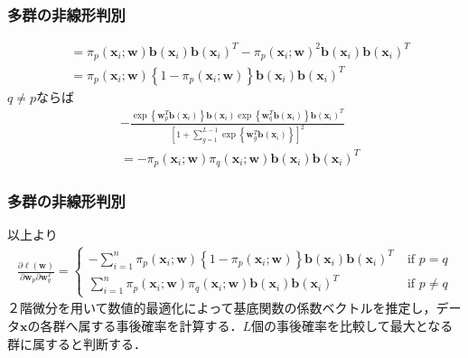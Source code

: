\documentclass[dvipdfmx,cjk]{beamer}
\theoremstyle{example}
\begin{document}
\begin{frame}
    \frametitle{多群の非線形判別}
    \begin{align*}
         & =\pi_p(\boldsymbol{x}_i;\boldsymbol{w})\boldsymbol{b}(\boldsymbol{x}_i)\boldsymbol{b}(\boldsymbol{x}_i)^T-\pi_p(\boldsymbol{x}_i;\boldsymbol{w})^2\boldsymbol{b}(\boldsymbol{x}_i)\boldsymbol{b}(\boldsymbol{x}_i)^T \\
         & =\pi_p(\boldsymbol{x}_i;\boldsymbol{w})\left\{1-\pi_p(\boldsymbol{x}_i;\boldsymbol{w})\right\}\boldsymbol{b}(\boldsymbol{x}_i)\boldsymbol{b}(\boldsymbol{x}_i)^T
    \end{align*}
    $q\neq p$ならば
    \begin{align*}
         & -\frac{\exp\left\{\boldsymbol{w}_p^T\boldsymbol{b}(\boldsymbol{x}_i)\right\}\boldsymbol{b}(\boldsymbol{x}_i)\exp\left\{\boldsymbol{w}_q^T\boldsymbol{b}(\boldsymbol{x}_i)\right\}\boldsymbol{b}(\boldsymbol{x}_i)^T}{\left[1+\sum\limits_{g=1}^{L-1}\exp\left\{\boldsymbol{w}_g^T\boldsymbol{b}(\boldsymbol{x}_i)\right\}\right]^2} \\
         & =-\pi_p(\boldsymbol{x}_i;\boldsymbol{w})\pi_q(\boldsymbol{x}_i;\boldsymbol{w})\boldsymbol{b}(\boldsymbol{x}_i)\boldsymbol{b}(\boldsymbol{x}_i)^T
    \end{align*}
\end{frame}

\begin{frame}
    \frametitle{多群の非線形判別}
    以上より
    \begin{align*}
        \frac{\partial \ell(\boldsymbol{w})}{\partial \boldsymbol{w}_p \partial \boldsymbol{w}_q^T}=
        \begin{cases}
            -\sum\limits_{i=1}^{n}\pi_p(\boldsymbol{x}_i;\boldsymbol{w})\left\{1-\pi_p(\boldsymbol{x}_i;\boldsymbol{w})\right\}\boldsymbol{b}(\boldsymbol{x}_i)\boldsymbol{b}(\boldsymbol{x}_i)^T\; & \text{if $p=q$}     \\
            \sum\limits_{i=1}^{n}\pi_p(\boldsymbol{x}_i;\boldsymbol{w})\pi_q(\boldsymbol{x}_i;\boldsymbol{w})\boldsymbol{b}(\boldsymbol{x}_i)\boldsymbol{b}(\boldsymbol{x}_i)^T\;                   & \text{if $p\neq q$}
        \end{cases}
    \end{align*}
    ２階微分を用いて数値的最適化によって基底関数の係数ベクトルを推定し，データ$\boldsymbol{x}$の各群へ属する事後確率を計算する．$L$個の事後確率を比較して最大となる群に属すると判断する．
\end{frame}
\end{document}
